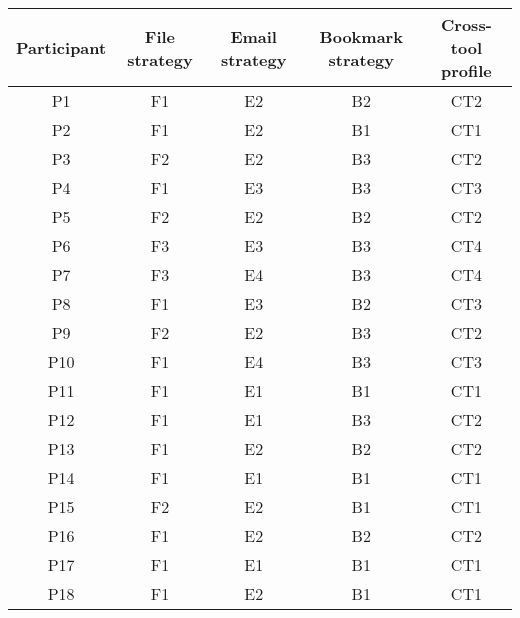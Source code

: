 \begin{table}[btp]
\begin{center}
\begin{footnotesize}
\setlength{\extrarowheight}{2pt}
\begin{tabular}{|c|c|c|c|c|}
\hline
        \textbf{Participant} &       \textbf{File strategy} &         \textbf{Email strategy} &         \textbf{Bookmark strategy} & \textbf{Cross-tool profile} \\
\hline
         P1 &         F1 &         E2 &         B2 &        CT2 \\
\hline
         P2 &         F1 &         E2 &         B1 &        CT1 \\
\hline
         P3 &         F2 &         E2 &         B3 &        CT2 \\
\hline
         P4 &         F1 &         E3 &         B3 &        CT3 \\
\hline
         P5 &         F2 &         E2 &         B2 &        CT2 \\
\hline
         P6 &         F3 &         E3 &         B3 &        CT4 \\
\hline
         P7 &         F3 &         E4 &         B3 &        CT4 \\
\hline
         P8 &         F1 &         E3 &         B2 &        CT3 \\
\hline
         P9 &         F2 &         E2 &         B3 &        CT2 \\
\hline
        P10 &         F1 &         E4 &         B3 &        CT3 \\
\hline
        P11 &         F1 &         E1 &         B1 &        CT1 \\
\hline
        P12 &         F1 &         E1 &         B3 &        CT2 \\
\hline
        P13 &         F1 &         E2 &         B2 &        CT2 \\
\hline
        P14 &         F1 &         E1 &         B1 &        CT1 \\
\hline
        P15 &         F2 &         E2 &         B1 &        CT1 \\
\hline
        P16 &         F1 &         E2 &         B2 &        CT2 \\
\hline
        P17 &         F1 &         E1 &         B1 &        CT1 \\
\hline
        P18 &         F1 &         E2 &         B1 &        CT1 \\

\end{tabular}
\end{footnotesize}
\end{center}
\end{table}

